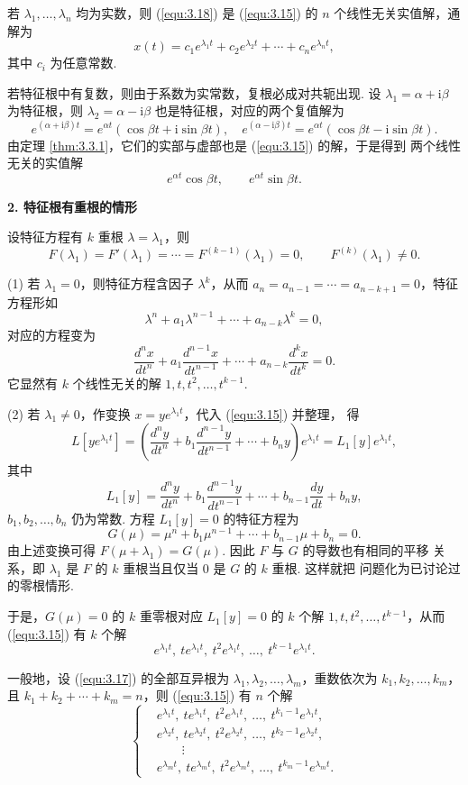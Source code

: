 若 $\lambda_1,\dots,\lambda_n$ 均为实数，则 (\ref{equ:3.18}) 是 (\ref{equ:3.15}) 的
$n$ 个线性无关实值解，通解为
\[
x(t)=c_1e^{\lambda_1t}+c_2e^{\lambda_2t}+\cdots+c_ne^{\lambda_nt},
\]
其中 $c_i$ 为任意常数.

若特征根中有复数，则由于系数为实常数，复根必成对共轭出现. 设
$\lambda_1=\alpha+\mathrm{i}\beta$ 为特征根，则
$\lambda_2=\alpha-\mathrm{i}\beta$ 也是特征根，对应的两个复值解为
\[
e^{(\alpha+\mathrm{i}\beta)t}=e^{\alpha t}(\cos\beta t+\mathrm{i}\sin\beta t),
\quad
e^{(\alpha-\mathrm{i}\beta)t}=e^{\alpha t}(\cos\beta t-\mathrm{i}\sin\beta t).
\]
由定理 \ref{thm:3.3.1}，它们的实部与虚部也是 (\ref{equ:3.15}) 的解，于是得到
两个线性无关的实值解
\[
e^{\alpha t}\cos\beta t,\qquad e^{\alpha t}\sin\beta t.
\]

\textbf{2. 特征根有重根的情形}

设特征方程有 $k$ 重根 $\lambda=\lambda_1$，则
\[
F(\lambda_1)=F'(\lambda_1)=\cdots=F^{(k-1)}(\lambda_1)=0,\qquad
F^{(k)}(\lambda_1)\neq0.
\]

(1) 若 $\lambda_1=0$，则特征方程含因子 $\lambda^k$，从而
$a_n=a_{n-1}=\cdots=a_{n-k+1}=0$，特征方程形如
\[
\lambda^n+a_1\lambda^{n-1}+\cdots+a_{n-k}\lambda^k=0,
\]
对应的方程变为
\[
\frac{d^n x}{dt^n}+a_1\frac{d^{n-1}x}{dt^{n-1}}+\cdots
+a_{n-k}\frac{d^k x}{dt^k}=0.
\]
它显然有 $k$ 个线性无关的解 $1,t,t^2,\dots,t^{k-1}$.

(2) 若 $\lambda_1\neq0$，作变换 $x=ye^{\lambda_1t}$，代入 (\ref{equ:3.15}) 并整理，
得
\[
L\left[ye^{\lambda_1t}\right]
=\left(\frac{d^n y}{dt^n}+b_1\frac{d^{n-1}y}{dt^{n-1}}+\cdots+b_ny\right)
e^{\lambda_1t}=L_1[y]e^{\lambda_1t},
\]
其中
\[
L_1[y]=\frac{d^n y}{dt^n}+b_1\frac{d^{n-1}y}{dt^{n-1}}+\cdots
+b_{n-1}\frac{dy}{dt}+b_ny,
\]
$b_1,b_2,\dots,b_n$ 仍为常数. 方程 $L_1[y]=0$ 的特征方程为
\[
G(\mu)=\mu^n+b_1\mu^{n-1}+\cdots+b_{n-1}\mu+b_n=0.
\]
由上述变换可得 $F(\mu+\lambda_1)=G(\mu)$. 因此 $F$ 与 $G$ 的导数也有相同的平移
关系，即 $\lambda_1$ 是 $F$ 的 $k$ 重根当且仅当 $0$ 是 $G$ 的 $k$ 重根. 这样就把
问题化为已讨论过的零根情形.

于是，$G(\mu)=0$ 的 $k$ 重零根对应 $L_1[y]=0$ 的 $k$ 个解
$1,t,t^2,\dots,t^{k-1}$，从而 (\ref{equ:3.15}) 有 $k$ 个解
\[
e^{\lambda_1t},\ te^{\lambda_1t},\ t^2e^{\lambda_1t},\ \dots,\
t^{k-1}e^{\lambda_1t}.
\]

一般地，设 (\ref{equ:3.17}) 的全部互异根为
$\lambda_1,\lambda_2,\dots,\lambda_m$，重数依次为 $k_1,k_2,\dots,k_m$，且
$k_1+k_2+\cdots+k_m=n$，则 (\ref{equ:3.15}) 有 $n$ 个解
\[
\left\{
\begin{aligned}
&e^{\lambda_1t},\ te^{\lambda_1t},\ t^2e^{\lambda_1t},\ \dots,\
t^{k_1-1}e^{\lambda_1t},\\
&e^{\lambda_2t},\ te^{\lambda_2t},\ t^2e^{\lambda_2t},\ \dots,\
t^{k_2-1}e^{\lambda_2t},\\
&\qquad\vdots\\
&e^{\lambda_mt},\ te^{\lambda_mt},\ t^2e^{\lambda_mt},\ \dots,\
t^{k_m-1}e^{\lambda_mt}.
\end{aligned}
\right.
\]

